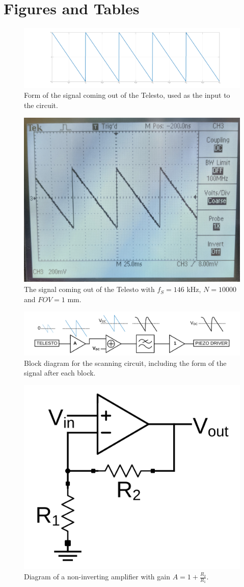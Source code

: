 \documentclass{article}
\begin{document}
\pagebreak
\section{Figures and Tables}
\begin{figure}[h!]
\centering
\includegraphics[width=\textwidth]{Figures/inputsignal.png}
\caption{Form of the signal coming out of the Telesto, used as the input to the circuit.}
\label{input}
\end{figure}

\begin{figure}[h!]
\centering
\includegraphics[width=.5\textwidth]{Figures/inputscope.jpg}
\caption{The signal coming out of the Telesto with $f_S=146$ kHz, $N=10000$ and $FOV=1$ mm.}
\label{inputscope}
\end{figure}


\begin{figure}
\centering
\includegraphics[width=\textwidth]{Figures/ProbeDriverBlock.png}
\caption{Block diagram for the scanning circuit, including the form of the signal after each block.}
\label{block}
\end{figure}



\begin{figure}
\centering
\includegraphics[width=.5\textwidth]{Figures/noninvamp.png}
\caption{Diagram of a non-inverting amplifier with gain $A= 1+ \frac{R_2}{R_1}$.}
\label{noninvamp}
\end{figure}
\end{document}
